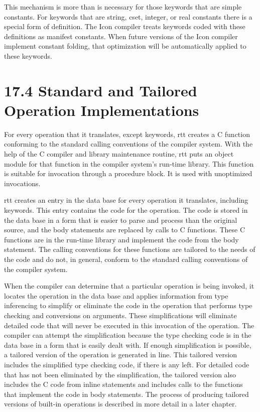 This mechanism is more than is necessary for those keywords that are
simple constants. For keywords that are string, cset, integer, or real
constants there is a special form of definition. The Icon compiler
treats keywords coded with these definitions as manifest
constants. When future versions of the Icon compiler implement
constant folding, that optimization will be automatically applied to
these keywords.


\section[17.4 Standard and Tailored Operation Implementations]{17.4 Standard and Tailored Operation Implementations}

For every operation that it translates, except keywords, rtt creates a
C function conforming to the standard calling conventions of the
compiler system. With the help of the C compiler and library
maintenance routine, rtt puts an object module for that function in
the compiler system's run-time library. This function is suitable for
invocation through a procedure block. It is used with unoptimized
invocations.

rtt creates an entry in the data base for every operation it
translates, including keywords. This entry contains the code for the
operation. The code is stored in the data base in a form that is
easier to parse and process than the original source, and the body
statements are replaced by calls to C functions. These C functions are
in the run-time library and implement the code from the body
statement. The calling conventions for these functions are tailored to
the needs of the code and do not, in general, conform to the standard
calling conventions of the compiler system.

When the compiler can determine that a particular operation is being
invoked, it locates the operation in the data base and applies
information from type inferencing to simplify or eliminate the code in
the operation that performs type checking and conversions on
arguments. These simplifications will eliminate detailed code that
will never be executed in this invocation of the operation. The
compiler can attempt the simplification because the type checking code
is in the data base in a form that is easily dealt with. If enough
simplification is possible, a tailored version of the operation is
generated in line. This tailored version includes the simplified type
checking code, if there is any left.  For detailed code that has not
been eliminated by the simplification, the tailored version also
includes the C code from inline statements and includes calls to the
functions that implement the code in body statements. The process of
producing tailored versions of built-in operations is described in
more detail in a later chapter.

